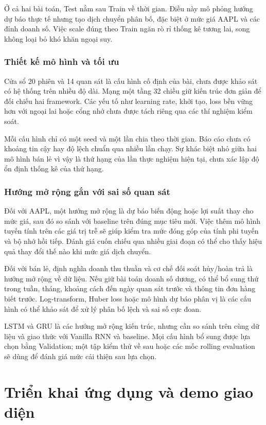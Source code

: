 \documentclass[12pt,a4paper]{report}
\begin{document}
Ở cả hai bài toán, Test nằm sau Train về thời gian. Điều này mô phỏng hướng dự báo thực tế nhưng tạo dịch chuyển phân bố, đặc biệt ở mức giá AAPL và các đỉnh doanh số. Việc scale đúng theo Train ngăn rò rỉ thống kê tương lai, song không loại bỏ khó khăn ngoại suy.

\subsection{Thiết kế mô hình và tối ưu}
Cửa sổ 20 phiên và 14 quan sát là cấu hình cố định của bài, chưa được khảo sát có hệ thống trên nhiều độ dài. Mạng một tầng 32 chiều giữ kiến trúc đơn giản để đối chiếu hai framework. Các yếu tố như learning rate, khởi tạo, loss bền vững hơn với ngoại lai hoặc cổng nhớ chưa được tách riêng qua các thí nghiệm kiểm soát.

Mỗi cấu hình chỉ có một seed và một lần chia theo thời gian. Báo cáo chưa có khoảng tin cậy hay độ lệch chuẩn qua nhiều lần chạy. Sự khác biệt nhỏ giữa hai mô hình bán lẻ vì vậy là thứ hạng của lần thực nghiệm hiện tại, chưa xác lập độ ổn định thống kê của thứ hạng.

\subsection{Hướng mở rộng gắn với sai số quan sát}
Đối với AAPL, một hướng mở rộng là dự báo biến động hoặc lợi suất thay cho mức giá, sau đó so sánh với baseline trên đúng mục tiêu mới. Việc thêm mô hình tuyến tính trên các giá trị trễ sẽ giúp kiểm tra mức đóng góp của tính phi tuyến và bộ nhớ hồi tiếp. Đánh giá cuốn chiếu qua nhiều giai đoạn có thể cho thấy hiệu quả thay đổi thế nào khi mức giá dịch chuyển.

Đối với bán lẻ, định nghĩa doanh thu thuần và cơ chế đối soát hủy/hoàn trả là hướng mở rộng về dữ liệu. Nếu giữ bài toán doanh số dương, có thể bổ sung thứ trong tuần, tháng, khoảng cách đến ngày quan sát trước và thông tin đơn hàng biết trước. Log-transform, Huber loss hoặc mô hình dự báo phân vị là các cấu hình có thể khảo sát để xử lý phân bố lệch và sai số cực đoan.

LSTM và GRU là các hướng mở rộng kiến trúc, nhưng cần so sánh trên cùng dữ liệu và giao thức với Vanilla RNN và baseline. Mọi cấu hình bổ sung được lựa chọn bằng Validation; một tập kiểm thử về sau hoặc các mốc rolling evaluation sẽ dùng để đánh giá mức cải thiện sau lựa chọn.


\chapter{Triển khai ứng dụng và demo giao diện}
\label{chap:deployment}
\end{document}
